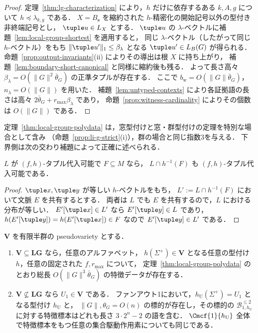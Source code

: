 \begin{proof}
定理~\ref{thm:lg-characterization} により，$h$ だけに依存するある $k,A,g$ について
$h\preceq\lambda_{k,g}$ である．
$X=B_{\mathbf s}$ を縮約された $h$-精密化の開始記号以外の型付き非終端記号とし，
$\tuple u\in L_X$ とする．
$\tuple u$ の $\lambda$-ベクトルに補題~\ref{lem:local-group-shortest} を適用すると，
同じ $\lambda$-ベクトル（したがって同じ $h$-ベクトル）をもち
$\|\tuple u'\|_1\le\beta_\lambda$ となる $\tuple u'\in L_B(G)$ が得られる．
命題~\ref{prop:output-invariants}(ii) によりその導出は根 $X$ に持ち上がり，
補題~\ref{lem:boundary-short-canonical} と同様に縮約後も残る．
よって長さ高々 $\beta_\lambda=O(\|G\|^2\bar\theta_G)$ の正準タプルが存在する．
ここで $b_{\mathrm w}=O(\|G\|\bar\theta_G)$，$n_\lambda=O(\|G\|)$ を用いた．
補題~\ref{lem:untyped-contexts} により各証拠語の長さは高々
$2\bar\theta_G+r_{\max}\beta_\lambda$ であり，
命題~\ref{prop:witness-cardinality} によりその個数は $O(\|G\|)$ である．
\end{proof}

定理~\ref{thm:local-group-polydata} は，窓型付けと窓・群型付けの定理を特別な場合として含み
（命題~\ref{prop:li-g-strict}(i)），群の場合と同じ指数3を与える．
下界側は次の交わり補題によって正確に述べられる．

\begin{lemma}[型フィルタは代入可能性を保つ]
\label{lem:type-filter}
$L$ が $(f,h)$-タプル代入可能で $F\subseteq M$ なら，
$L\cap h^{-1}(F)$ も $(f,h)$-タプル代入可能である．
\end{lemma}

\begin{proof}
$\tuple x,\tuple y$ が等しい $h$-ベクトルをもち，
$L':=L\cap h^{-1}(F)$ において文脈 $E$ を共有するとする．
両者は $L$ でも $E$ を共有するので，$L$ における分布が等しい．
$E'[\tuple x]\in L'$ なら $E'[\tuple y]\in L$ であり，
$h(E'[\tuple y])=h(E'[\tuple x])\in F$ なので $E'[\tuple y]\in L'$ である．
\end{proof}

\begin{corollary}
\label{cor:pseudovariety-dichotomy}
$\mathbf V$ を有限半群の pseudovariety とする．
\begin{enumerate}[label=\textup{(\roman*)},leftmargin=*]
\item $\mathbf V\subseteq\mathbf{LG}$ なら，任意のアルファベット，
$h(\Sigma^+)\in\mathbf V$ となる任意の型付け $h$，任意の固定された $f,r_{\max}$ について，
定理~\ref{thm:local-group-polydata} のとおり総長 $O(\|G\|^3\bar\theta_G)$ の特徴データが存在する．
\item $\mathbf V\not\subseteq\mathbf{LG}$ なら $U_1\in\mathbf V$ である．
ファンアウト1において，$h_{\mathrm U}(\Sigma^+)=U_1$ となる型付け $h_{\mathrm U}$ と，
$\|G\|,\theta_G=O(n)$ の標的が存在し，その標的の
$\mathcal B^{\le2}_{1,h_{\mathrm U}}$ に対する特徴標本はどれも長さ $3\cdot2^n-2$ の語を含む．
$\Cmcf{1}{h_{\mathrm U}}$ 全体で特徴標本をもつ任意の集合駆動作用素についても同じである．
\end{enumerate}
\end{corollary}

